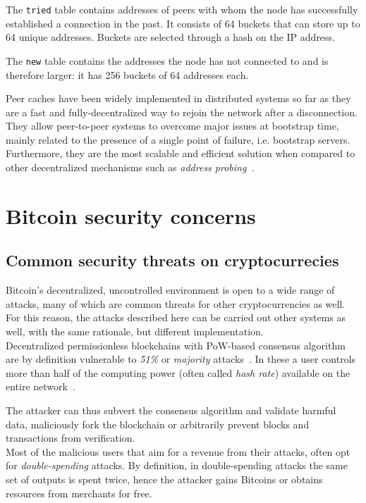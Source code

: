 \documentclass[12pt, letterpaper, twoside]{article}
\begin{document}
The \texttt{tried} table contains addresses of peers with whom the node has successfully established a connection in the past. It consists of 64 buckets that can store up to 64 unique addresses. Buckets are selected through a hash on the IP address.

The \texttt{new} table contains the addresses the node has not connected to and is therefore larger: it has 256 buckets of 64 addresses each.

Peer caches have been widely implemented in distributed systems so far as they are a fast and fully-decentralized way to rejoin the network after a disconnection. They allow peer-to-peer systems to overcome major issues at bootstrap time, mainly related to the presence of a single point of failure, i.e. bootstrap servers. Furthermore, they are the most scalable and efficient solution when compared to other decentralized mechanisms such as \textit{address probing}~\cite{decentrbootstrapp2p}.

\section{Bitcoin security concerns}\label{sec:securityintro}
\subsection{Common security threats on cryptocurrecies}
Bitcoin's decentralized, uncontrolled environment is open to a wide range of attacks, many of which are common threats for other cryptocurrencies as well. For this reason, the attacks described here can be carried out other systems as well, with the same rationale, but different implementation.\\

Decentralized permissionless blockchains with PoW-based consensus algorithm are by definition vulnerable to \textit{51\%} or \textit{majority} attacks~\cite{nakamoto}. In these a user controls more than half of the computing power (often called \textit{hash rate}) available on the entire network~\cite{51atk}.

The attacker can thus subvert the consensus algorithm and validate harmful data, maliciously fork the blockchain or arbitrarily prevent blocks and transactions from verification.\\

Most of the malicious users that aim for a revenue from their attacks, often opt for \textit{double-spending} attacks. By definition, in double-spending attacks the same set of outputs is spent twice, hence the attacker gains Bitcoins or obtains resources from merchants for free.
\end{document}
